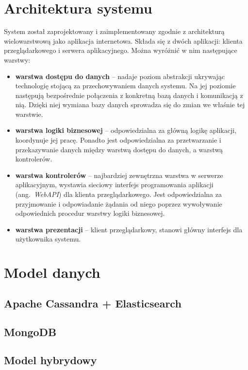 \section{Architektura systemu}

System został zaprojektowany i zaimplementowany zgodnie z architekturą wielowarstwową jako aplikacja internetowa.
Składa się z dwóch aplikacji: klienta przeglądarkowego i serwera aplikacyjnego.
Można wyróżnić w nim następujące warstwy:
\begin{itemize}
    \item \textbf{warstwa dostępu do danych} -- nadaje poziom abstrakcji ukrywając technologię stojącą za przechowywaniem danych systemu.
    Na jej poziomie następują bezpośrednie połączenia z konkretną bazą danych i komunikacją z nią.
    Dzięki niej wymiana bazy danych sprowadza się do zmian we właśnie tej warstwie.
    \item \textbf{warstwa logiki biznesowej} -- odpowiedzialna za główną logikę aplikacji, koordynuje jej pracę. 
    Ponadto jest odpowiedzialna za przetwarzanie i przekazywanie danych między warstwą dostępu do danych, a warstwą kontrolerów.
    \item \textbf{warstwa kontrolerów} -- najbardziej zewnętrzna warstwa w serwerze aplikacyjnym, wystawia sieciowy interfejs programowania aplikacji (ang.~\textit{WebAPI}) dla klienta przeglądarkowego.
    Jest odpowiedzialna za przyjmowanie i odpowiadanie żądania od niego poprzez wywoływanie odpowiednich procedur warstwy logiki biznesowej.
    \item \textbf{warstwa prezentacji} -- klient przeglądarkowy, stanowi główny interfejs dla użytkownika systemu.
\end{itemize}

\section{Model danych}

\subsection{Apache Cassandra + Elasticsearch}

\subsection{MongoDB}

\subsection{Model hybrydowy}